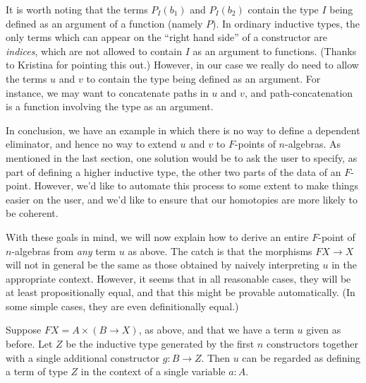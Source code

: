 \documentclass{amsart}
\begin{document}
It is worth noting that the terms $P_I(b_1)$ and $P_I(b_2)$ contain the type $I$ being defined as an argument of a function (namely $P$).  In ordinary inductive types, the only terms which can appear on the ``right hand side'' of a constructor are \emph{indices}, which are not allowed to contain $I$ as an argument to functions.  (Thanks to Kristina for pointing this out.)  However, in our case we really do need to allow the terms $u$ and $v$ to contain the type being defined as an argument.  For instance, we may want to concatenate paths in $u$ and $v$, and path-concatenation is a function involving the type as an argument.

In conclusion, we have an example in which there is no way to define a dependent eliminator, and hence no way to extend $u$ and $v$ to $F$-points of $n$-algebras.  As mentioned in the last section, one solution would be to ask the user to specify, as part of defining a higher inductive type, the other two parts of the data of an $F$-point.  However, we'd like to automate this process to some extent to make things easier on the user, and we'd like to ensure that our homotopies are more likely to be coherent.

With these goals in mind, we will now explain how to derive an entire $F$-point of $n$-algebras from \emph{any} term $u$ as above.  The catch is that the morphisms $FX\to X$ will not in general be the same as those obtained by naively interpreting $u$ in the appropriate context.  However, it seems that in all reasonable cases, they will be at least propositionally equal, and that this might be provable automatically.  (In some simple cases, they are even definitionally equal.)

Suppose $FX = A \times (B\to X)$, as above, and that we have a term $u$ given as before.  Let $Z$ be the inductive type generated by the first $n$ constructors together with a single additional constructor $g:B\to Z$.  Then $u$ can be regarded as defining a term of type $Z$ in the context of a single variable $a:A$.
\end{document}
